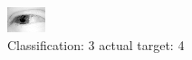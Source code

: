 \begin{figure}[h!]
\begin{center}
\includegraphics[width=0.60\columnwidth]{figures/ID2501_class_3_target_4.png}
\end{center}
\caption{ Classification: 3 actual target: 4}
\label{fig:ID2501_class_3_target_4}
\end{figure}
